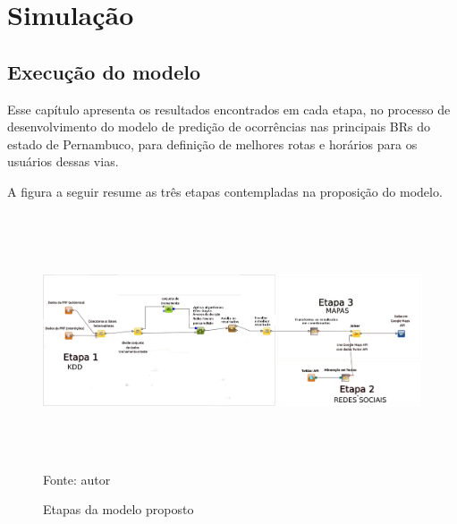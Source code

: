 \chapter{Simulação}\label{simula}

\section{Execução do modelo}

Esse capítulo apresenta os resultados encontrados em cada etapa, no processo de desenvolvimento do modelo de predição de ocorrências nas principais BRs do estado de Pernambuco, para definição de melhores rotas e horários para os usuários dessas vias.

\vspace{5mm}

A figura a seguir resume as três etapas contempladas na proposição do modelo.

\begin{figure}[ht]
\centering
\caption{Etapas da modelo proposto}
\includegraphics[width=175mm, height=75mm]{Figuras/Cronograma/metodologia.png}\\
\tiny Fonte: autor
\end{figure}

